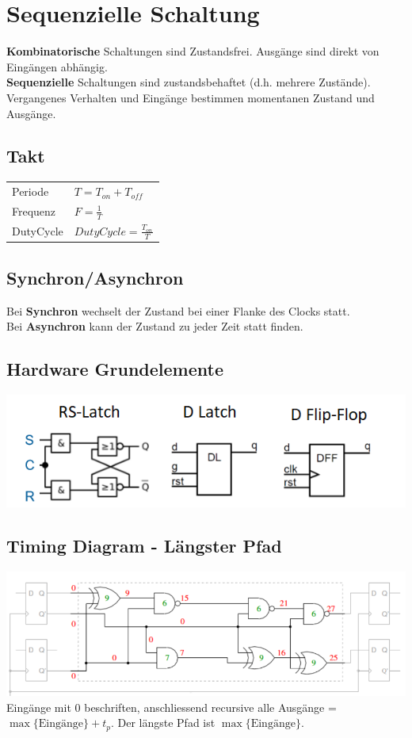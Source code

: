 \section{Sequenzielle Schaltung}
\textbf{Kombinatorische} Schaltungen sind Zustandsfrei. Ausgänge sind direkt von Eingängen abhängig.\\
\textbf{Sequenzielle} Schaltungen sind zustandsbehaftet (d.h. mehrere Zustände). Vergangenes Verhalten und Eingänge bestimmen momentanen Zustand und Ausgänge.

\subsection{Takt}
\begin{tabular}{ll}
	Periode & $T = T_{on} + T_{off}$ \\
	Frequenz &  $F = \frac{1}{T}$ \\
	DutyCycle &  $DutyCycle = \frac{T_{on}}{T}$ \\
\end{tabular}

\subsection{Synchron/Asynchron}
Bei \textbf{Synchron} wechselt der Zustand bei einer Flanke des Clocks statt.\\
Bei \textbf{Asynchron} kann der Zustand zu jeder Zeit statt finden.

\subsection{Hardware Grundelemente}
\includegraphics[width=\columnwidth]{./Images/FlipFlops.png}

\subsection{Timing Diagram - Längster Pfad}
\begin{minipage}{\columnwidth}
	\includegraphics[width=\columnwidth,keepaspectratio=true]{./Images/pfad.png}\\
	Eingänge mit $0$ beschriften, anschliessend recursive alle Ausgänge = $\max\{\text{Eingänge}\} + t_p$. Der längste Pfad ist $\max\{\text{Eingänge}\}$.
\end{minipage}